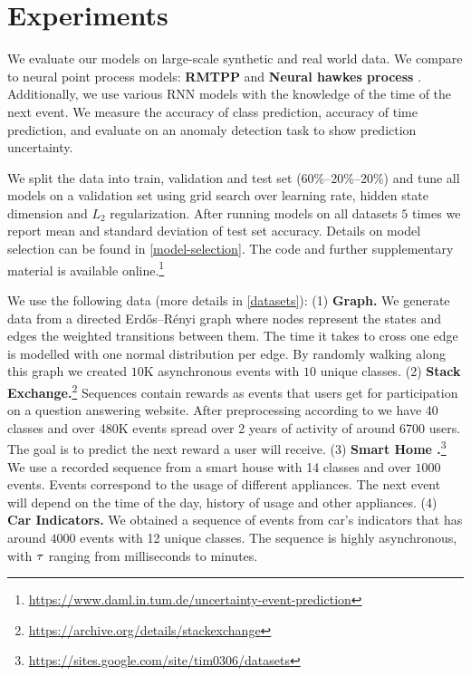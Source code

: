 \section{Experiments}
\label{sec:experiments_010}

We evaluate our models on large-scale synthetic and real world data. We compare to neural point process models: \textbf{RMTPP} \cite{RMTPP} and \textbf{Neural hawkes process} \cite{hawkes}. Additionally, we use various RNN models with the knowledge of the time of the next event. We measure the accuracy of class prediction, accuracy of time prediction, and evaluate on an anomaly detection task to show prediction uncertainty.

We split the data into train, validation and test set (60\%--20\%--20\%) and tune all models on a validation set using grid search over learning rate, hidden state dimension and $L_2$ regularization. After running models on all datasets $5$ times we report mean and standard deviation of test set accuracy. Details on model selection can be found in \cref{model-selection}. The code and further supplementary material is available online.\footnote{\url{https://www.daml.in.tum.de/uncertainty-event-prediction}}

We use the following data (more details in \cref{datasets}): (1) \textbf{Graph.} We generate data from a directed Erdős–Rényi graph where nodes represent the states and edges the weighted transitions between them. The time it takes to cross one edge is modelled with one normal distribution per edge. By randomly walking along this graph we created $10$K asynchronous events with $10$ unique classes.
(2) \textbf{Stack Exchange.}\footnote{\url{https://archive.org/details/stackexchange}} Sequences contain rewards as events that users get for participation on a question answering website. After preprocessing according to \cite{RMTPP} we have 40 classes and over 480K events spread over 2 years of activity of around 6700 users. The goal is to predict the next reward a user will receive.
(3) \textbf{Smart Home \normalfont\cite{SmartHome}.}\footnote{\url{https://sites.google.com/site/tim0306/datasets}} We use a recorded sequence from a smart house with 14 classes and over $1000$ events. Events correspond to the usage of different appliances. The next event will depend on the time of the day, history of usage and other appliances.
(4) \textbf{Car Indicators.} We obtained a sequence of events from car's indicators that has around $4000$ events with 12 unique classes. The sequence is highly asynchronous, with $\tau$ ranging from milliseconds to minutes.

\label{visualization}

\label{event_prediction}

\label{time_prediction}

\label{anomaly_detection}
